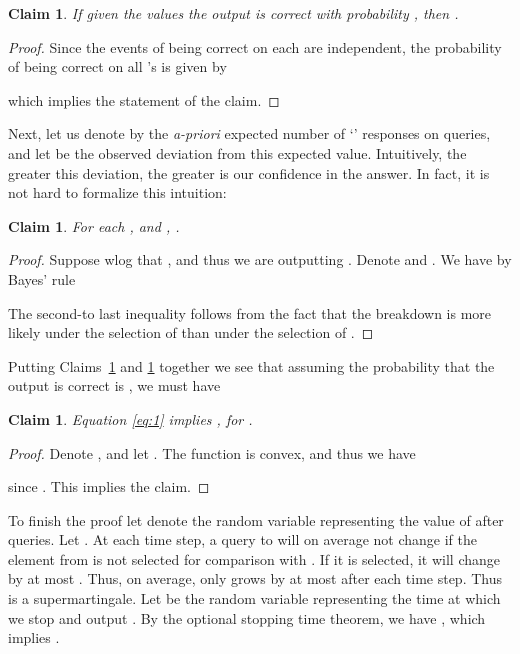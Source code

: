 \documentclass[12pt]{article}
\newtheorem{claim}[theorem]{Claim}
\begin{document}
\begin{claim} \label{cl:1}
If given the values   the output  is correct with probability , then 
.
\end{claim}

\begin{proof}
Since the events of being correct on each  are independent, the probability of being correct on all 's is given by

which implies the statement of the claim. 
\end{proof}

Next, let us denote by  the {\em a-priori} expected number of `' responses on  queries, and let  be
the observed deviation from this expected value. Intuitively, the greater this deviation, the greater is our confidence in the answer. 
In fact, it is not hard to formalize this intuition:

\begin{claim} \label{cl:2}
For each , and , . 
\end{claim}

\begin{proof}
Suppose wlog that , and thus we are outputting . Denote  and . We have by Bayes' rule

The second-to last inequality follows from the fact that the breakdown  is more likely under the selection of  than under the selection of . 
\end{proof}

Putting Claims~\ref{cl:1} and \ref{cl:2} together we see that assuming the probability that the output  is correct is , we must have


\begin{claim}\label{cl:3}
Equation \eqref{eq:1} implies , for .  
\end{claim}

\begin{proof}
Denote , and let . The function  is convex, and thus we have

since . This implies the claim. 
\end{proof}

To finish the proof let  denote the random variable representing the value of  after  queries. Let . 
At each time step, a query to  will on average not change  if the element from  is not selected for comparison with . If it is selected, 
it will change  by at most . Thus, on average,  only grows by at most  after each time step. Thus  is a supermartingale. 
Let  be the random variable representing the time at which we stop and output .  By the optional stopping time theorem, we have , which implies
.
\end{document}
